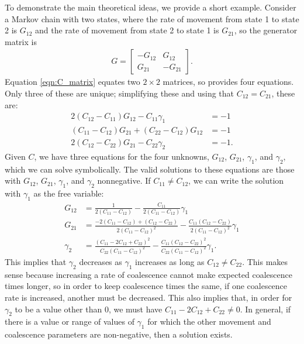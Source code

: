 \documentclass{article}
\begin{document}
To demonstrate the main theoretical ideas,
we provide a short example.
Consider a Markov chain with two states, 
where the rate of movement from state 1 to state 2 is $G_{12}$
and the rate of movement from state 2 to state 1 is $G_{21}$,
so the generator matrix is
\begin{align*}
G = 
    \begin{bmatrix}
        -G_{12}  & G_{12} \\
         G_{21}  & -G_{21}
    \end{bmatrix}.
\end{align*}
Equation \ref{eqn:C_matrix} equates two $2 \times 2$ matrices,
so provides four equations. Only three of these are unique;
simplifying these and using that $C_{12} = C_{21}$, these are:
\begin{align*}
    2 \left(C_{12} - C_{11} \right) G_{12} - C_{11} \gamma_1 &= -1 \\
    \left(C_{11} - C_{12} \right) G_{21} + \left(C_{22} - C_{12}\right) G_{12} &= -1 \\
    2 \left( C_{12} - C_{22} \right) G_{21} - C_{22} \gamma_2 &= -1 .
\end{align*}
Given $C$, we have three equations for the four unknowns, 
$G_{12}$, $G_{21}$, $\gamma_{1}$, and $\gamma_{2}$,
which we can solve symbolically.
The valid solutions to these equations are those with $G_{12}$, $G_{21}$, $\gamma_1$,
and $\gamma_2$ nonnegative.
If $C_{11} \neq C_{12}$, 
we can write the solution with $\gamma_1$ as the free variable:
\begin{align*}
G_{12} &= \frac{1}{2(C_{11} - C_{12})} - \frac{C_{11}}{2(C_{11} - C_{12})}\gamma_1 \\
G_{21} &= \frac{-2(C_{11} - C_{12}) + (C_{12} - C_{22})}{2(C_{11} - C_{12})^2}
	- \frac{C_{11}(C_{12} - C_{22})}{2(C_{11} - C_{12})^2}\gamma_1 \\
\gamma_2 &= \frac{(C_{11} - 2C_{12} + C_{22})^2}{C_{22}(C_{11} - C_{12})^2}
	- \frac{C_{11}(C_{12} - C_{22})^2}{C_{22}(C_{11} - C_{12})^2}\gamma_1.
\end{align*}
This implies that $\gamma_2$ decreases as $\gamma_1$ increases as long as $C_{12} \neq C_{22}$.
This makes sense because
increasing a rate of coalescence cannot make expected coalescence times longer,
so in order to keep coalescence times the same,
if one coalescence rate is increased, another must be decreased.
This also implies that, in order for $\gamma_2$ to be a value other than $0$, 
we must have $C_{11} - 2C_{12} + C_{22} \neq 0$.
In general, if there is a value or range of values of $\gamma_1$
for which the other movement and coalescence parameters are non-negative,
then a solution exists.
\end{document}
